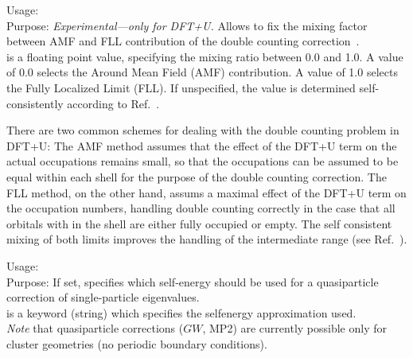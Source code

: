 {
  \noindent
  Usage:   \\[1.0ex]
  Purpose: \emph{Experimental---only for DFT+U.} Allows to fix the mixing
    factor between AMF and FLL contribution of the double counting
    correction~\cite{Petukhov03}. \\[1.0ex] 
   is a floating point value, specifying the mixing
    ratio between 0.0 and 1.0. A value of 0.0 selects the Around Mean Field
    (AMF) contribution. A value of 1.0 selects the Fully Localized Limit
    (FLL). If unspecified, the value is determined self-consistently according
    to Ref.~\cite{Petukhov03}. \\ 
}

There are two common schemes for dealing with the double counting problem in DFT+U: The AMF method
assumes that the effect of the DFT+U term on the actual occupations remains small, so that the
occupations can be assumed to be equal within each shell for the purpose of the double counting
correction. The FLL method, on the other hand, assums a maximal effect of the DFT+U term on the
occupation numbers, handling double counting correctly in the case that all orbitals with in the
shell are either fully occupied or empty. The self consistent mixing of both limits improves the
handling of the intermediate range (see Ref.~\cite{Petukhov03}).

{
 \noindent
 Usage:   \\[1.0ex]
 Purpose: If set, specifies which self-energy should be used for a
 quasiparticle correction of single-particle eigenvalues. \\[1.0ex]
  is a keyword (string) which specifies the
   selfenergy approximation used. \\
}
\emph{Note} that quasiparticle corrections ($GW$, MP2) are currently possible
only for cluster geometries (no periodic boundary conditions).


